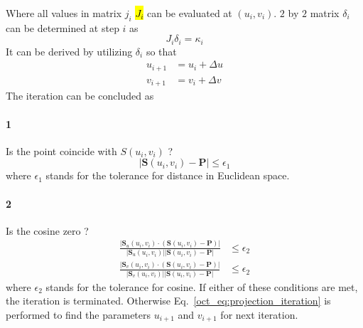 %
Where all values in matrix $j_i$ \hl{$J_i$} can be evaluated at $(u_i, v_i)$.
$2$ by $2$ matrix $\delta_i$ can be determined at step $i$ as
\begin{equation}
    J_i \delta_i = \kappa_i
\end{equation}
%
It can be derived by utilizing $\delta_i$ so that
\begin{subequations}
\begin{align}
    u_{i+1} & = u_i + \Delta u \\
    v_{i+1} & = v_i + \Delta v
\end{align}
\label{oct_eq:projection_iteration}
\end{subequations}
%
The iteration can be concluded as
\paragraph{1}
Is the point coincide with $S(u_i, v_i)$ ?
\begin{equation*}
    |\mathbf{S} (u_i, v_i) - \mathbf{P}| \leq \epsilon_1
\end{equation*}
%
where $\epsilon_1$ stands for the tolerance for distance in Euclidean space.
\paragraph{2}
Is the cosine zero ?
\begin{align*}
    \frac{
        |\mathbf{S}_u (u_i, v_i) \cdot
        \left(
            \mathbf{S}(u_i, v_i) - \mathbf{P}
        \right)|
    }{
        |\mathbf{S}_u (u_i, v_i)|
        |\mathbf{S}(u_i, v_i) - \mathbf{P}|
    } & \leq \epsilon_2 \\
    \frac{
        |\mathbf{S}_v (u_i, v_i) \cdot
        \left(
            \mathbf{S}(u_i, v_i) - \mathbf{P}
        \right)|
    }{
        |\mathbf{S}_v (u_i, v_i)|
        |\mathbf{S}(u_i, v_i) - \mathbf{P}|
    } & \leq \epsilon_2
\end{align*}
%
where $\epsilon_2$ stands for the tolerance for cosine.
If either of these conditions are met, the iteration is terminated.
Otherwise Eq.~\ref{oct_eq:projection_iteration} is performed to find the parameters $u_{i+1}$ and $v_{i+1}$ for next iteration.
